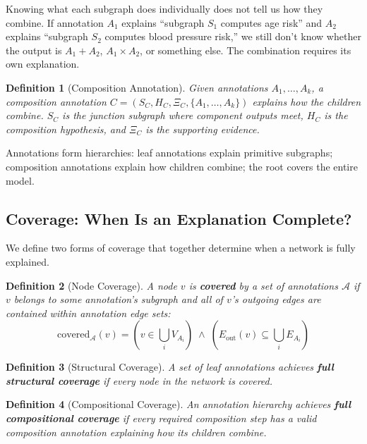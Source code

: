 \documentclass[11pt]{article}
\newtheorem{definition}{Definition}
\begin{document}
Knowing what each subgraph does individually does not tell us how they combine. If annotation $A_1$ explains ``subgraph $S_1$ computes age risk'' and $A_2$ explains ``subgraph $S_2$ computes blood pressure risk,'' we still don't know whether the output is $A_1 + A_2$, $A_1 \times A_2$, or something else. The combination requires its own explanation.

\begin{definition}[Composition Annotation]
\label{def:composition}
Given annotations $A_1, \ldots, A_k$, a composition annotation $C = (S_C, H_C, \Xi_C, \{A_1, \ldots, A_k\})$ explains how the children combine. $S_C$ is the junction subgraph where component outputs meet, $H_C$ is the composition hypothesis, and $\Xi_C$ is the supporting evidence.
\end{definition}

Annotations form hierarchies: leaf annotations explain primitive subgraphs; composition annotations explain how children combine; the root covers the entire model.

\subsection{Coverage: When Is an Explanation Complete?}

We define two forms of coverage that together determine when a network is fully explained.

\begin{definition}[Node Coverage]
\label{def:coverage}
A node $v$ is \textbf{covered} by a set of annotations $\mathcal{A}$ if $v$ belongs to some annotation's subgraph and all of $v$'s outgoing edges are contained within annotation edge sets:
\[
\text{covered}_\mathcal{A}(v) = (v \in \bigcup_i V_{A_i}) \;\land\; (E_{\text{out}}(v) \subseteq \bigcup_i E_{A_i})
\]
\end{definition}

\begin{definition}[Structural Coverage]
\label{def:structural-coverage}
A set of leaf annotations achieves \textbf{full structural coverage} if every node in the network is covered.
\end{definition}

\begin{definition}[Compositional Coverage]
\label{def:compositional-coverage}
An annotation hierarchy achieves \textbf{full compositional coverage} if every required composition step has a valid composition annotation explaining how its children combine.
\end{definition}
\end{document}
